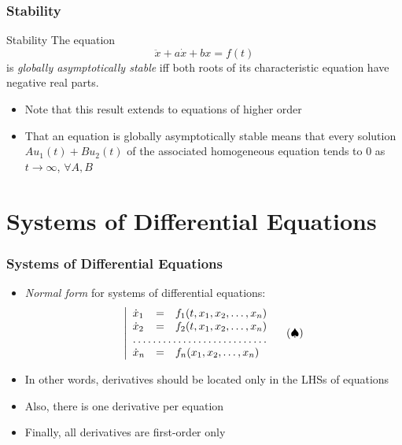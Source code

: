 \documentclass[10pt,usenames,dvipsnames]{beamer}
\theoremstyle{definition}
\begin{document}
\begin{frame}[fragile]
\frametitle{Stability}
\begin{block}{Stability}
	The equation
	\[
		\ddot{x} + a\dot{x} + bx = f(t)
	\]
	is \textit{globally asymptotically stable} iff both roots of its characteristic equation have negative real parts.
\end{block}
\begin{itemize}
	\item Note that this result extends to equations of higher order
	\item That an equation is globally asymptotically stable means that every solution $Au_{1}(t) + Bu_{2}(t)$ of the associated homogeneous equation tends to 0 as $t\to\infty$, $\forall A,B$
\end{itemize}
\end{frame}

\section{Systems of Differential Equations}
\begin{frame}[fragile]
	\frametitle{Systems of Differential Equations}
	\begin{itemize}
		\item \textit{Normal form} for systems of differential equations:
		\[
			\left|
			\begin{array}{lcl}
				\dot{x}_{1} & = & f_{1}(t, x_{1}, x_{2},\ldots,x_{n})\\
				\dot{x}_{2} & = & f_{2}(t, x_{1}, x_{2},\ldots,x_{n})\\
				\hdotsfor{3}\\
				\dot{x}_{n} & = & f_{n}(x_{1}, x_{2},\ldots,x_{n})\\
			\end{array}\right. \quad (\spadesuit)
		\]
		
		\item In other words, derivatives should be located only in the LHSs of equations
		
		\item Also, there is one derivative per equation
		
		\item Finally, all derivatives are first-order only
	\end{itemize}
\end{frame}
\end{document}
